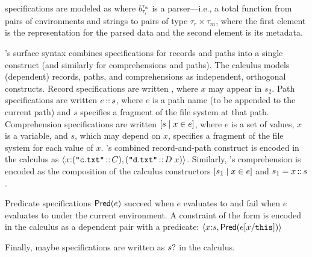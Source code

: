 \padshaskell{} specifications are modeled as  where
$b^{\tau_m}_{\tau_r}$ is a parser---i.e., a total function from pairs
of environments and strings to pairs of type $\tau_r \times \tau_m$,
where the first element is the representation for the parsed data and
the second element is its metadata.

\forest{}'s surface syntax combines specifications for records and
paths into a single construct (and similarly for comprehensions and
paths). The calculus models (dependent) records, paths, and
comprehensions as independent, orthogonal constructs.  Record
specifications are written , where $x$ may appear
in $s_2$.  Path specifications are written $e\,{::}\,s$, where $e$
is a path name (to be appended to the current path) and $s$ specifies
a fragment of the file system at that path. Comprehension
specifications are written $[ s \mid x \in e ]$, where $e$ is a set of
values, $x$ is a variable, and $s$, which may depend on $x$, specifies
a fragment of the file system for each value of $x$.  \forest{}'s
combined record-and-path construct  is encoded in the calculus as
$\langle x {:} (\texttt{"}\mathtt{c.txt}\texttt{"}\,{::}\,C), (\texttt{"}\mathtt{d.txt}\texttt{"}\,{::}\,D\;
    x) \rangle$.  Similarly, \forest{}'s comprehension \cd{[x :: s | x <-
  e]} is encoded as the composition of the calculus constructors
$[ s_1 \mid x \in e ]$ and $s_1 = x\,{::}\,s$.

Predicate specifications $\mathsf{Pred}(e)$ succeed when $e$ evaluates to
\True{} and fail when $e$ evaluates to \False{} under the current
environment.  A \forest{} constraint of the form  is
encoded in the calculus as a dependent pair with a predicate:
$\langle x {:} s, \mathsf{Pred}(e[x/\mathtt{this}]) \rangle$

Finally, maybe specifications are written as $s?$ in the
calculus.

